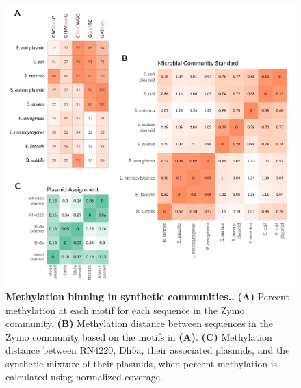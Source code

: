 \begin{figure}[!hb]
\centering
\includegraphics[width = 1\linewidth,keepaspectratio]{figure/controls.pdf}
\caption[Methylation binning in synthetic communities.]{{\bf Methylation binning in synthetic communities..} {\bf (A)} Percent methylation at each motif for each sequence in the Zymo community. {\bf (B)} Methylation distance between sequences in the Zymo community based on the motifs in {\bf (A)}. {\bf (C)} Methylation distance between RN4220, Dh5a, their associated plasmids, and the synthetic mixture of their plasmids, when percent methylation is calculated using normalized coverage. }
\label{fig:controls}
\end{figure}



